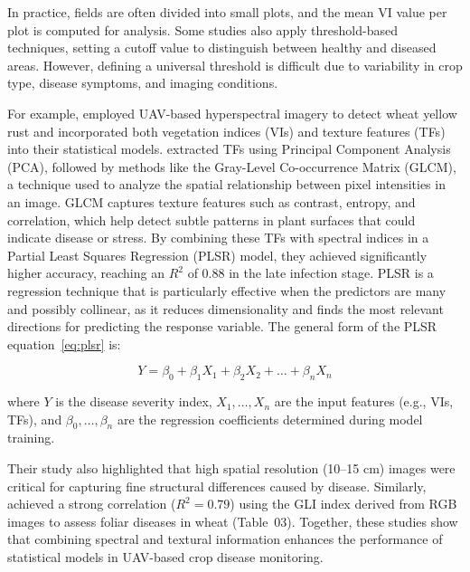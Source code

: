 In practice, fields are often divided into small plots, and the mean VI value per plot is computed for analysis. Some studies also apply threshold-based techniques, setting a cutoff value to distinguish between healthy and diseased areas. However, defining a universal threshold is difficult due to variability in crop type, disease symptoms, and imaging conditions.

For example, \parencite{guo2021wheat} employed UAV-based hyperspectral imagery to detect wheat yellow rust and incorporated both vegetation indices (VIs) and texture features (TFs) into their statistical models. \parencite{guo2021wheat} extracted TFs using Principal Component Analysis (PCA), followed by methods like the Gray-Level Co-occurrence Matrix (GLCM), a technique used to analyze the spatial relationship between pixel intensities in an image. GLCM captures texture features such as contrast, entropy, and correlation, which help detect subtle patterns in plant surfaces that could indicate disease or stress. By combining these TFs with spectral indices in a Partial Least Squares Regression (PLSR) model, they achieved significantly higher accuracy, reaching an \( R^2 \) of 0.88 in the late infection stage.
PLSR is a regression technique that is particularly effective when the predictors are many and possibly collinear, as it reduces dimensionality and finds the most relevant directions for predicting the response variable. The general form of the PLSR equation~\eqref{eq:plsr} is:

\begin{equation}
Y = \beta_0 + \beta_1X_1 + \beta_2X_2 + \ldots + \beta_nX_n
\label{eq:plsr}
\end{equation}

where $Y$ is the disease severity index, $X_1, \ldots, X_n$ are the input features (e.g., VIs, TFs), and $\beta_0, \ldots, \beta_n$ are the regression coefficients determined during model training.

Their study also highlighted that high spatial resolution (10–15 cm) images were critical for capturing fine structural differences caused by disease. Similarly, \parencite{bhandari2020assessing} achieved a strong correlation ($R^2 = 0.79$) using the GLI index derived from RGB images to assess foliar diseases in wheat (Table~03). Together, these studies show that combining spectral and textural information enhances the performance of statistical models in UAV-based crop disease monitoring.

